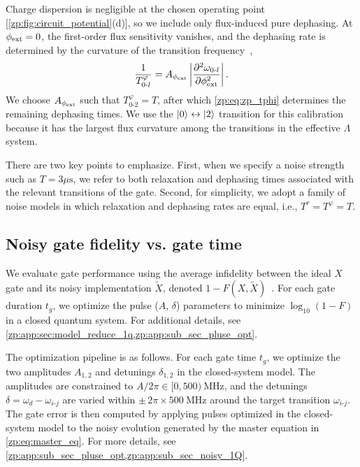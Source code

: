 Charge dispersion is negligible at the chosen operating point [\cref{zp:fig:circuit_potential}(d)], so we include only flux-induced pure dephasing.
At $\phi_{\rm ext}=0$, the first-order flux sensitivity vanishes, and the dephasing rate is determined by the curvature of the transition frequency~\cite{hays2025nondegenerate},
\begin{align} \label{zp:eq:zp_tphi}
\frac{1}{T^\varphi_{0\text{-}l}} = A_{\phi_{\rm ext}} \left| \frac{\partial^2 \omega_{0\text{-}l}}{\partial \phi_{\rm ext}^2} \right|.
\end{align}
We choose $A_{\phi_{\rm ext}}$ such that $T^\varphi_{0\text{-}2}=T$, after which \cref{zp:eq:zp_tphi} determines the remaining dephasing times.
We use the $\ket{0}\leftrightarrow\ket{2}$ transition for this calibration because it has the largest flux curvature among the transitions in the effective $\Lambda$ system.

There are two key points to emphasize.
First, when we specify a noise strength such as $T = 3 \mu\text{s}$, we refer to both relaxation and dephasing times associated with the relevant transitions of the gate.
Second, for simplicity, we adopt a family of noise models in which relaxation and dephasing rates are equal, i.e., $T^r = T^\varphi = T$.

\subsection{Noisy gate fidelity vs. gate time} \label{zp:sec:fidelity_1q}
We evaluate gate performance using the average infidelity between the ideal $X$ gate and its noisy implementation $\tilde{X}$, denoted $1-F(X,\tilde{X})$~\cite{pedersen_fidelity_2007,Wood2015}.
For each gate duration $t_g$, we optimize the pulse ($A$, $\delta$) parameters to minimize $\log_{10}(1-F)$ in a closed quantum system.
For additional details, see \cref{zp:app:sec:model_reduce_1q,zp:app:sub_sec_pluse_opt}.

The optimization pipeline is as follows.
For each gate time $t_g$, we optimize the two amplitudes $A_{1,2}$ and detunings $\delta_{1,2}$ in the closed-system model.
The amplitudes are constrained to $A/2\pi\in[0,500)~\text{MHz}$, and the detunings $\delta=\omega_d-\omega_{i\text{-}j}$ are varied within $\pm\,2\pi\times500~\text{MHz}$ around the target transition $\omega_{i\text{-}j}$.
The gate error is then computed by applying pulses optimized in the closed-system model to the noisy evolution generated by the master equation in \cref{zp:eq:master_eq}.
For more details, see \cref{zp:app:sub_sec_pluse_opt,zp:app:sub_sec_noisy_1Q}.

